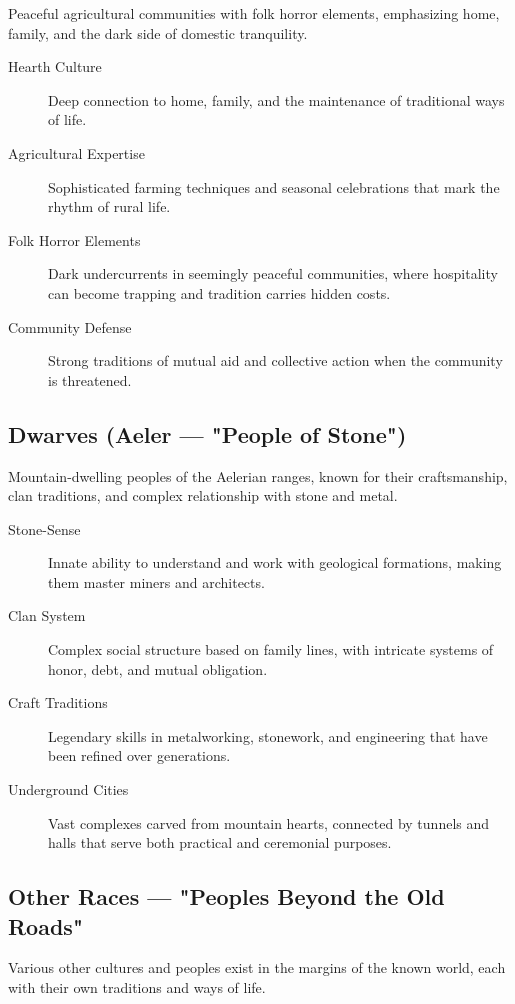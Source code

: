 Peaceful agricultural communities with folk horror elements, emphasizing home, family, and the dark side of domestic tranquility.

\begin{description}
\item[Hearth Culture] Deep connection to home, family, and the maintenance of traditional ways of life.
\item[Agricultural Expertise] Sophisticated farming techniques and seasonal celebrations that mark the rhythm of rural life.
\item[Folk Horror Elements] Dark undercurrents in seemingly peaceful communities, where hospitality can become trapping and tradition carries hidden costs.
\item[Community Defense] Strong traditions of mutual aid and collective action when the community is threatened.
\end{description}

\subsection*{Dwarves (Aeler — "People of Stone")}

Mountain-dwelling peoples of the Aelerian ranges, known for their craftsmanship, clan traditions, and complex relationship with stone and metal.

\begin{description}
\item[Stone-Sense] Innate ability to understand and work with geological formations, making them master miners and architects.
\item[Clan System] Complex social structure based on family lines, with intricate systems of honor, debt, and mutual obligation.
\item[Craft Traditions] Legendary skills in metalworking, stonework, and engineering that have been refined over generations.
\item[Underground Cities] Vast complexes carved from mountain hearts, connected by tunnels and halls that serve both practical and ceremonial purposes.
\end{description}

\subsection*{Other Races — "Peoples Beyond the Old Roads"}

Various other cultures and peoples exist in the margins of the known world, each with their own traditions and ways of life.

